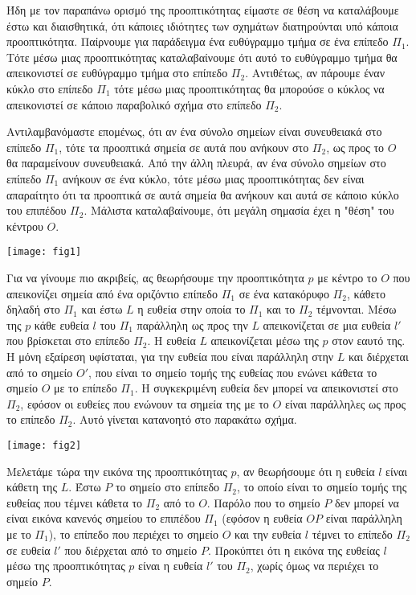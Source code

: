 \documentclass[12pt, a4paper]{book}
\begin{document}
Ήδη με τον παραπάνω ορισμό της προοπτικότητας είμαστε σε θέση να καταλάβουμε έστω και διαισθητικά, ότι κάποιες ιδιότητες των σχημάτων διατηρούνται υπό κάποια προοπτικότητα. Παίρνουμε για παράδειγμα ένα ευθύγραμμο τμήμα σε ένα επίπεδο $Π_1$. Τότε μέσω μιας προοπτικότητας καταλαβαίνουμε ότι αυτό το ευθύγραμμο τμήμα θα απεικονιστεί σε ευθύγραμμο τμήμα στο επίπεδο $Π_2$. Αντιθέτως, αν πάρουμε έναν κύκλο στο επίπεδο $Π_1$ τότε μέσω μιας προοπτικότητας θα μπορούσε ο κύκλος να απεικονιστεί σε κάποιο παραβολικό σχήμα στο επίπεδο $Π_2$.

Αντιλαμβανόμαστε επομένως, ότι αν ένα σύνολο σημείων είναι συνευθειακά στο επίπεδο $Π_1$, τότε τα προοπτικά σημεία σε αυτά που ανήκουν στο $Π_2$, ως προς το $Ο$ θα παραμείνουν συνευθειακά. Από την άλλη πλευρά, αν ένα σύνολο σημείων στο επίπεδο $Π_1$ ανήκουν σε ένα κύκλο, τότε μέσω μιας προοπτικότητας δεν είναι απαραίτητο ότι τα προοπτικά σε αυτά σημεία θα ανήκουν και αυτά σε κάποιο κύκλο του επιπέδου $Π_2$. Μάλιστα καταλαβαίνουμε, ότι μεγάλη σημασία έχει η "θέση" του κέντρου $Ο$.

\begin{center}
\texttt{[image: fig1]}
\end{center}

Για να γίνουμε πιο ακριβείς, ας θεωρήσουμε την προοπτικότητα $p$ με κέντρο το $Ο$ που απεικονίζει σημεία από ένα οριζόντιο επίπεδο $Π_1$ σε ένα κατακόρυφο $Π_2$, κάθετο δηλαδή στο $Π_1$ και έστω $L$ η ευθεία στην οποία το $Π_1$ και το $Π_2$ τέμνονται. Μέσω της $p$ κάθε ευθεία $l$ του $Π_1$ παράλληλη ως προς την $L$ απεικονίζεται σε μια ευθεία $l'$ που βρίσκεται στο επίπεδο $Π_2$. Η ευθεία $L$ απεικονίζεται μέσω της $p$ στον εαυτό της. Η μόνη εξαίρεση υφίσταται, για την ευθεία που είναι παράλληλη στην $L$ και διέρχεται από το σημείο $Ο'$, που είναι το σημείο τομής της ευθείας που ενώνει κάθετα το σημείο $Ο$ με το επίπεδο $Π_1$. Η συγκεκριμένη ευθεία δεν μπορεί να απεικονιστεί στο $Π_2$, εφόσον οι ευθείες που ενώνουν τα σημεία της με το $Ο$ είναι παράλληλες ως προς το επίπεδο $Π_2$. Αυτό γίνεται κατανοητό στο παρακάτω σχήμα.

\begin{center}
\texttt{[image: fig2]}
\end{center}

Μελετάμε τώρα την εικόνα της προοπτικότητας $p$, αν θεωρήσουμε ότι η ευθεία $l$ είναι κάθετη της $L$. Έστω $P$ το σημείο στο επίπεδο $Π_2$, το οποίο είναι το σημείο τομής της ευθείας που τέμνει κάθετα το $Π_2$ από το $Ο$. Παρόλο που το σημείο $P$ δεν μπορεί να είναι εικόνα κανενός σημείου το επιπέδου $Π_1$ (εφόσον η ευθεία $OP$ είναι παράλληλη με το $Π_1$), το επίπεδο που περιέχει το σημείο $Ο$ και την ευθεία $l$ τέμνει το επίπεδο $Π_2$ σε ευθεία $l'$ που διέρχεται από το σημείο $P$. Προκύπτει ότι η εικόνα της ευθείας $l$ μέσω της προοπτικότητας $p$ είναι η ευθεία $l'$ του $Π_2$, χωρίς όμως να περιέχει το σημείο $P$. 
\end{document}
